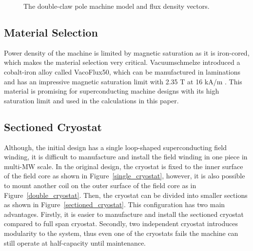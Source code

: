\documentclass[12pt]{iopart}
\begin{document}
\begin{figure}[]
  \caption{The double-claw pole machine model and flux density vectors.} 
  \label{double_claw_parts}
\end{figure}

\subsection{Material Selection}

Power density of the machine is limited by magnetic saturation as it is iron-cored, which makes the material selection very critical.  Vacuumschmelze introduced a cobalt-iron alloy called VacoFlux50, which can be manufactured in laminations and has an impressive magnetic saturation limit with 2.35 T at 16 kA/m \cite{vacoflux}. This material is promising for superconducting machine designs with its high saturation limit and used in the calculations in this paper.

\subsection{Sectioned Cryostat}

Although, the initial design has a single loop-shaped superconducting field winding, it is difficult to manufacture and install the field winding in one piece in multi-MW scale. In the original design, the cryostat is fixed to the inner surface of the field core as shown in Figure~\ref{single_cryostat}, however, it is also possible to mount another coil on the outer surface of the field core as in Figure~\ref{double_cryostat}. Then, the cryostat can be divided into smaller sections as shown in Figure~\ref{sectioned_cryostat}. This configuration has two main advantages. Firstly, it is easier to manufacture and install the sectioned cryostat compared to full span cryostat. Secondly, two independent cryostat introduces modularity to the system, thus even one of the cryostats fails  the machine can still operate at half-capacity until maintenance.
 
\end{document}
